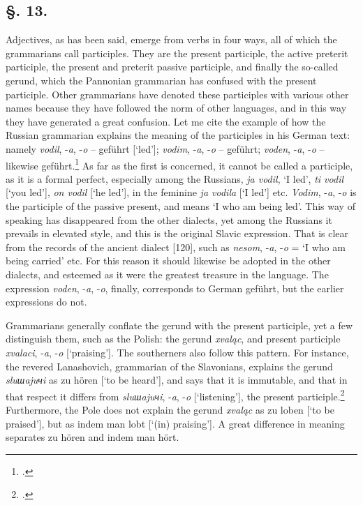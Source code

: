 \subsection*{\hspace*{\fill}§. 13.\hspace*{\fill}}

Adjectives, as has been said, emerge from verbs in four ways, all of which the grammarians call participles. They are the present participle, the active preterit participle, the present and preterit passive participle, and finally the so-called gerund, which the Pannonian grammarian has confused with the present participle. Other grammarians have denoted these participles with various other names because they have followed the norm of other languages, and in this way they have generated a great confusion. Let me cite the example of how the Russian grammarian explains the meaning of the participles in his German text: namely \textit{vodil}, -\textit{a}, -\textit{o} -- {\wieynk geführt} [‘led’]; \textit{vodim}, -\textit{a}, -\textit{o} -- {\wieynk geführt}; \textit{voden}, -\textit{a}, -\textit{o} -- likewise {\wieynk geführt}.\footnote{\citet[242]{puchmayer_lehrgebaude_1820}.} As far as the first is concerned, it cannot be called a participle, as it is a formal perfect, especially among the Russians, \textit{ja vodil}, ‘I led’, \textit{ti vodil} [‘you led’], \textit{on vodil} [‘he led’], in the feminine \textit{ja vodila} [‘I led’] etc. \textit{Vodim}, -\textit{a}, -\textit{o} is the participle of the passive present, and means ‘I who am being led’. This way of speaking has disappeared from the other dialects, yet among the Russians it prevails in elevated style, and this is the original Slavic expression. That is clear from the records of the ancient dialect [120], such as \textit{nesom}, -\textit{a}, -\textit{o} = ‘I who am being carried’ etc. For this reason it should likewise be adopted in the other dialects, and esteemed as it were the greatest treasure in the language. The expression \textit{voden}, -\textit{a}, -\textit{o}, finally, corresponds to German {\wieynk geführt}, but the earlier expressions do not.

Grammarians generally conflate the gerund with the present participle, yet a few distinguish them, such as the Polish: the gerund \textit{xvaląc}, and present participle \textit{xvalaci}, -\textit{a}, -\textit{o} [‘praising’]. The southerners also follow this pattern. For instance, the revered Lanashovich, grammarian of the Slavonians, explains the gerund \textit{sluшajuчi} as {\wieynk zu hören} [‘to be heard’], and says that it is immutable, and that in that respect it differs from \textit{sluшajuчi}, -\textit{a}, -\textit{o} [‘listening’], the present participle.\footnote{\citet[104]{lanosovic_anleitung_1795}.} Furthermore, the Pole does not explain the gerund \textit{xvaląc} as {\wieynk zu loben} [‘to be praised’], but as {\wieynk indem man lobt} [‘(in) praising’]. A great difference in meaning separates {\wieynk zu hören} and {\wieynk indem man hört}.

